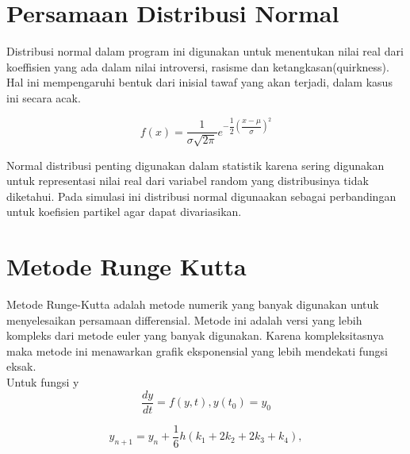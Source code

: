 \section{Persamaan Distribusi Normal }\label{cha:modelpartikel}
\hspace{0.5cm} Distribusi normal dalam program ini digunakan untuk menentukan nilai real dari koeffisien yang ada dalam nilai introversi, rasisme dan ketangkasan(quirkness). Hal ini mempengaruhi bentuk dari inisial tawaf yang akan terjadi, dalam kasus ini secara acak. 

\begin{equation}
f(x) =\dfrac{1}{\sigma \sqrt{2 \pi}} e^{-\dfrac{1}{2}(\dfrac{x-\mu}{\sigma})^2}
\end{equation}

\hspace{0.5cm} Normal distribusi penting digunakan dalam statistik karena sering digunakan untuk representasi nilai real dari variabel random yang distribusinya tidak diketahui\citep{Caseberg2009}. Pada simulasi ini distribusi normal digunaakan sebagai perbandingan untuk koefisien  partikel  agar dapat divariasikan.





\section{Metode Runge Kutta}\label{cha:metode perhitungan}
\hspace{0.5cm} Metode Runge-Kutta adalah metode numerik yang banyak digunakan untuk menyelesaikan persamaan differensial. Metode ini adalah versi yang lebih kompleks dari metode euler yang banyak digunakan. Karena kompleksitasnya maka metode ini menawarkan grafik eksponensial yang lebih mendekati fungsi eksak.\\
Untuk fungsi y
\begin{equation}
\dfrac{dy}{dt} =f(y,t) , y(t_0)=y_0
\end{equation}

\begin{equation}
y_{n+1} = y_{n} + \dfrac{1}{6}h (k_1+2k_2+2k_3+k_4),
\end{equation}

